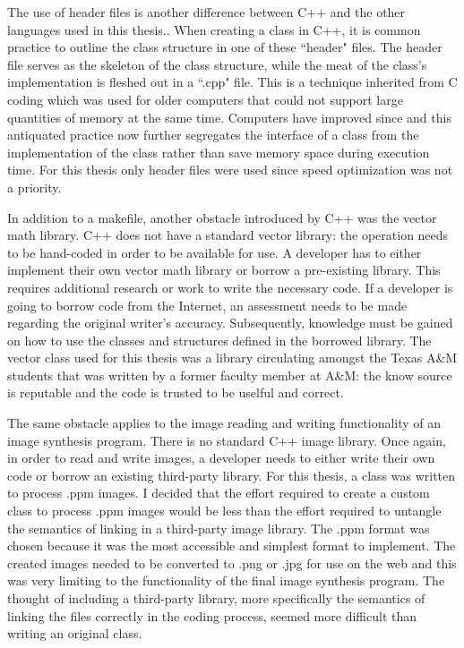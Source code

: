 The use of header files is another difference between C++ and the other languages used in this thesis..  When creating a class in C++, it is common practice to outline the class structure in one of these ``header" files. The header file serves as the skeleton of the class structure, while the meat of the class's implementation is fleshed out in a ``.cpp" file.  This is a technique inherited from C coding which was used for older computers that could not support large quantities of memory at the same time.  Computers have improved since and this antiquated practice now further segregates the interface of a class from the implementation of the class rather than save memory space during execution time.  For this thesis only header files were used since speed optimization was not a priority.

In addition to a makefile, another obstacle introduced by C++ was the vector math library.  C++ does not have a standard vector library: the operation needs to be hand-coded in order to be available for use.  A developer has to either implement their own vector math library or borrow a pre-existing library.  This requires additional research or work to write the necessary code.  If a developer is going to borrow code from the Internet, an assessment needs to be made regarding the original writer's accuracy.  Subsequently, knowledge must be gained on how to use the classes and structures defined in the borrowed library.  The vector class used for this thesis was a library circulating amongst the Texas A\&M students that was written by a former faculty member at A\&M: the know source is reputable and the code is trusted to be uselful and correct.

The same obstacle applies to the image reading and writing functionality of an image synthesis program.  There is no standard C++ image library.  Once again, in order to read and write images, a developer needs to either write their own code or borrow an existing third-party library.  For this thesis, a class was written to process .ppm images.  I decided that the effort required to create a custom class to process .ppm images would be less than the effort required to untangle the semantics of linking in a third-party image library.  The .ppm format was chosen because it was the most accessible and simplest format to implement.  The created images needed to be converted to .png or .jpg for use on the web and this was very limiting to the functionality of the final image synthesis program.  The thought of including a third-party library, more specifically the semantics of linking the files correctly in the coding process, seemed more difficult than writing an original class.
